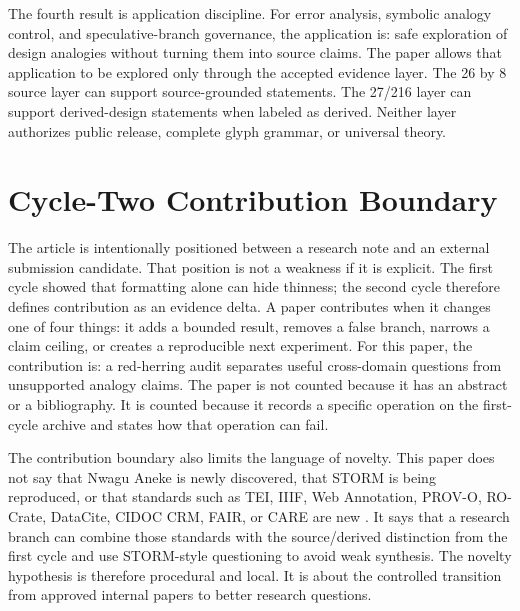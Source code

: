 \documentclass[sigconf,nonacm]{acmart}
\begin{document}
The fourth result is application discipline. For error analysis, symbolic analogy control, and speculative-branch governance, the application is:
safe exploration of design analogies without turning them into source claims. The paper allows that application to be explored only through the
accepted evidence layer. The 26 by 8 source layer can support source-grounded
statements. The 27/216 layer can support derived-design statements when labeled
as derived. Neither layer authorizes public release, complete glyph grammar, or
universal theory.


\section{Cycle-Two Contribution Boundary}
The article is intentionally positioned between a research note and an external
submission candidate. That position is not a weakness if it is explicit. The
first cycle showed that formatting alone can hide thinness; the second cycle
therefore defines contribution as an evidence delta. A paper contributes when it
changes one of four things: it adds a bounded result, removes a false branch,
narrows a claim ceiling, or creates a reproducible next experiment. For this
paper, the contribution is: a red-herring audit separates useful cross-domain questions from unsupported analogy claims. The paper is not counted because it has an
abstract or a bibliography. It is counted because it records a specific
operation on the first-cycle archive and states how that operation can fail.

The contribution boundary also limits the language of novelty. This paper does
not say that Nwagu Aneke is newly discovered, that STORM is being reproduced, or
that standards such as TEI, IIIF, Web Annotation, PROV-O, RO-Crate, DataCite,
CIDOC CRM, FAIR, or CARE are new \cite{teiP5Glyphs,iiifPresentation3,w3cAnnotationModel,w3cAnnotationVocab,w3cProvO,rocrate12,cidocCrm,datacite45,wilkinson2016fair,carroll2020care}. It says that a research
branch can combine those standards with the source/derived distinction from the
first cycle and use STORM-style questioning to avoid weak synthesis. The novelty
hypothesis is therefore procedural and local. It is about the controlled
transition from approved internal papers to better research questions.
\end{document}
